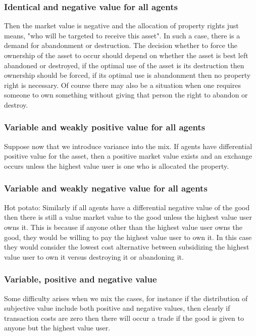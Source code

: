 \documentclass[12pt]{article}
\numberwithin{equation}{section}
\begin{document}
\subsubsection{Identical and negative value for all agents}

Then the market value is negative and the allocation of property rights just means,  "who will be targeted to receive this asset". In such a case, there is a demand for abandonment or destruction. The decision whether to force the ownership of the asset to occur should depend on whether the asset is best left abandoned or destroyed, if the optimal use of the asset is its destruction then ownership should be forced, if its optimal use is abandonment then no property right is necessary. Of course there may also be a situation when one requires someone to own something without giving that person the right to abandon or destroy.

\subsubsection{Variable and weakly positive value for all agents}

Suppose now that we introduce variance into the mix. If agents have differential positive value for the asset, then a positive market value exists and an exchange occurs unless the highest value user is one who is allocated the property.

\subsubsection{Variable and weakly negative value for all agents}

Hot potato: Similarly if all agents have a differential negative value of the good then there is still a value market value to the good unless the highest value user owns it. This is because if anyone other than the highest value user owns the good, they would be willing to pay the highest value user to own it. In this case they would consider the lowest cost alternative between subsidizing the highest value user to own it versus destroying it or abandoning it.

\subsubsection{Variable, positive and negative value}

Some difficulty arises when we mix the cases, for instance if the distribution of subjective value include both positive and negative values, then clearly if transaction costs are zero then there will occur a trade if the good is given to anyone but the highest value user.
\end{document}
